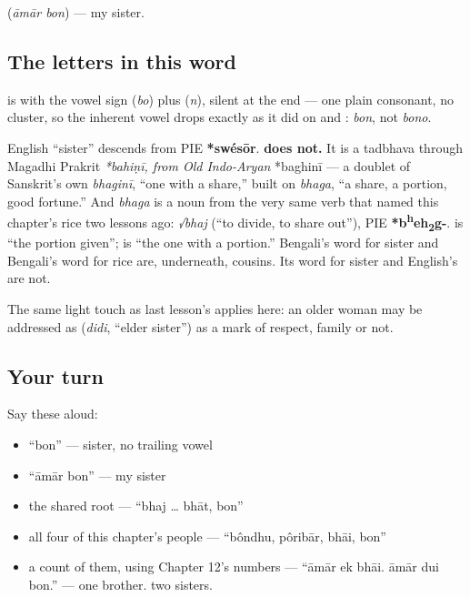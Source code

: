 \textbf{ } (\emph{āmār bon}) — my sister.

\subsection*{The letters in this word}
\textbf{} is \textbf{} with the vowel sign \textbf{} (\emph{bo}) plus \textbf{} (\emph{n}), silent at the end — one plain consonant, no cluster, so the inherent vowel drops exactly as it did on  and : \emph{bon}, not \emph{bono}.

\begin{cousinweb}
English \textquotedblleft{}sister\textquotedblright{} descends from PIE \textbf{*swésōr}. \textbf{ does not.} It is a tadbhava through Magadhi Prakrit \emph{*bahiṇī, from Old Indo-Aryan }*baghinī — a doublet of Sanskrit's own \emph{bhaginī}, \textquotedblleft{}one with a share,\textquotedblright{} built on \emph{bhaga}, \textquotedblleft{}a share, a portion, good fortune.\textquotedblright{} And \emph{bhaga} is a noun from the very same verb that named this chapter's rice two lessons ago: \emph{√bhaj} (\textquotedblleft{}to divide, to share out\textquotedblright{}), PIE \textbf{*b\textsuperscript{h}eh\textsubscript{2}g-}.  is \textquotedblleft{}the portion given\textquotedblright{};  is \textquotedblleft{}the one with a portion.\textquotedblright{} Bengali's word for sister and Bengali's word for rice are, underneath, cousins. Its word for sister and English's are not.

The same light touch as last lesson's  applies here: an older woman may be addressed as \textbf{} (\emph{didi}, \textquotedblleft{}elder sister\textquotedblright{}) as a mark of respect, family or not.
\end{cousinweb}

\subsection*{Your turn}
Say these aloud:

\begin{itemize}
\raggedright
  \item \textquotedblleft{}bon\textquotedblright{} — sister, no trailing vowel
  \item \textquotedblleft{}āmār bon\textquotedblright{} — my sister
  \item the shared root — \textquotedblleft{}bhaj … bhāt, bon\textquotedblright{}
  \item all four of this chapter's people — \textquotedblleft{}bôndhu, pôribār, bhāi, bon\textquotedblright{}
  \item a count of them, using Chapter 12's numbers — \textquotedblleft{}āmār ek bhāi. āmār dui bon.\textquotedblright{} — one brother. two sisters.
\end{itemize}

